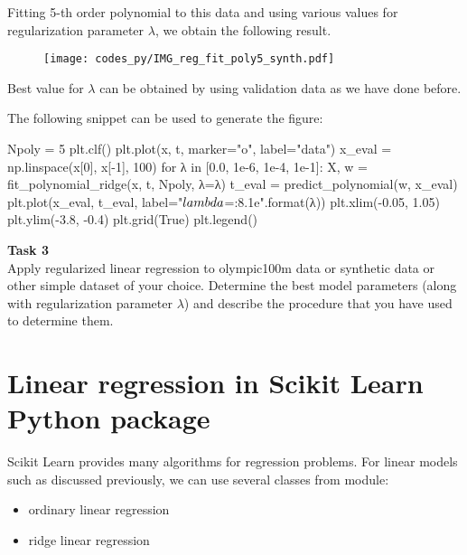 Fitting 5-th order polynomial to this data and using various values for regularization
parameter $\lambda$, we obtain the following result.
\begin{figure}[h]
\begin{center}
\texttt{[image: codes\_py/IMG\_reg\_fit\_poly5\_synth.pdf]}
\end{center}
\end{figure}
Best value for $\lambda$ can be obtained by using validation data as we have done before.

The following snippet can be used to generate the figure:
\begin{fullwidth}
\begin{pythoncode}
Npoly = 5
plt.clf()
plt.plot(x, t, marker="o", label="data")
x_eval = np.linspace(x[0], x[-1], 100)
for λ in [0.0, 1e-6, 1e-4, 1e-1]:
    X, w = fit_polynomial_ridge(x, t, Npoly, λ=λ)
    t_eval = predict_polynomial(w, x_eval)
    plt.plot(x_eval, t_eval, label="$\\lambda$={:8.1e}".format(λ))
plt.xlim(-0.05, 1.05)
plt.ylim(-3.8, -0.4)
plt.grid(True)
plt.legend()
\end{pythoncode}
\end{fullwidth}

\begin{mdframed}[topline=false,bottomline=false,leftline=true,rightline=false]
\textbf{Task 3}\\
Apply regularized linear regression to olympic100m data or synthetic data or other simple
dataset of your choice. Determine the best model parameters (along with regularization
parameter $\lambda$)
and describe the procedure that you have used to determine them.
\end{mdframed}

\section{Linear regression in Scikit Learn Python package}

Scikit Learn \citep{scikit-learn} provides many algorithms
for regression problems. For linear models such as discussed
previously, we can use several classes from 
module:
\begin{itemize}
\item ordinary linear regression
\item ridge linear regression
\end{itemize}






